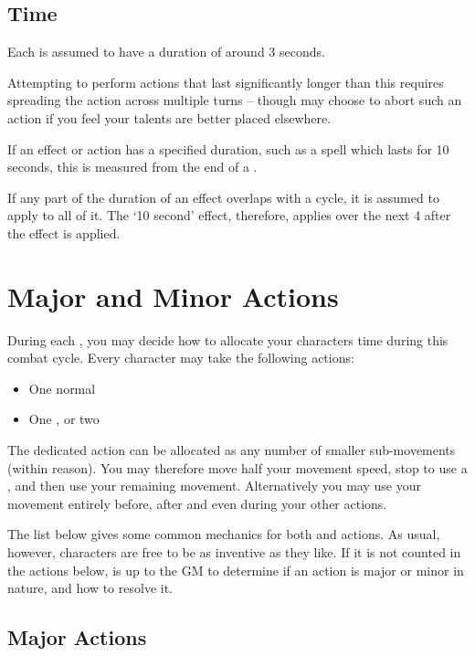 \subsection{Time}

Each  is assumed to have a duration of around 3 seconds. 

Attempting to perform actions that last significantly longer than this requires spreading the action across multiple turns -- though may choose to abort such an action if you feel your talents are better placed elsewhere. 

If an effect or action has a specified duration, such as a spell which lasts for 10 seconds, this is measured from the end of a .

If any part of the duration of an effect overlaps with a cycle, it is assumed to apply to all of it. The `10 second' effect, therefore, applies over the next 4  after the effect is applied. 


 \section{Major and Minor Actions} \label{S:CombatActions}
 
 During each , you may decide how to allocate your character\apos{}s time during this combat cycle. Every character may take the following actions: 
 
 \begin{itemize}
	\item One normal 
	\item One , or two 
 \end{itemize}
 
 The dedicated  action can be allocated as any number of smaller sub-movements (within reason). You may therefore move half your movement speed, stop to use a , and then use your remaining movement. Alternatively you may use your movement entirely before, after and even during your other actions.  
 
 The list below gives some common mechanics for both  and  actions. As usual, however, characters are free to be as inventive as they like. If it is not counted in the actions below, is up to the GM to determine if an action is major or minor in nature, and how to resolve it. 
 
 \subsection{Major Actions}
 
